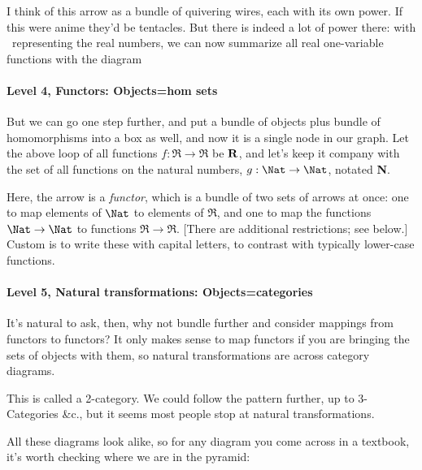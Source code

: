 \documentclass[11pt]{article}
\begin{document}
I think of this arrow as a bundle of quivering wires, each with its own power. If this were anime
they'd be tentacles. But there is indeed a lot of power there: with \Re\ representing the
real numbers, we can now summarize all real one-variable functions with the diagram 

\paragraph{Level 4, Functors: Objects=hom sets}
But we can go one step
further, and put a bundle of objects plus bundle of homomorphisms into a box as well, and
now it is a single node in our graph. Let the above loop of all functions $f:\Re\to\Re$
be $\bf R$, and let's keep it company with the set of all functions on the natural
numbers, $g:\Nat\to\Nat$, notated {\bf N}.



Here, the arrow is a {\em functor}, which is a bundle of two sets of arrows at once:
one to map elements of $\Nat$ to elements of $\Re$, and one to map the functions
$\Nat\to \Nat$ to functions $\Re\to \Re$. [There are additional restrictions; see
below.] Custom is to write these with capital letters, to contrast with typically
lower-case functions.

\paragraph{Level 5, Natural transformations: Objects=categories}
It's natural to ask, then, why not bundle further and consider mappings from functors to functors?
It only makes sense to map functors if you are bringing the sets of objects with them, so natural
transformations are across category diagrams.


This is called a 2-category.
We could follow the pattern further, up to 3-Categories \&c., but it seems most people stop at
natural transformations.

All these diagrams look alike, so for any diagram you come across in a textbook, it's
worth checking where we are in the pyramid:
\end{document}
